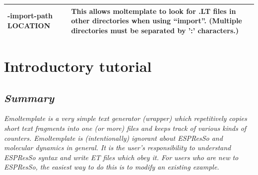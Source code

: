 \documentclass[11pt]{article}
\begin{document}
\begin{tabular}[h]{l|p{10cm}}
-import-path LOCATION
&
This allows moltemplate to look for .LT files
in other directories when using ``import''.
(Multiple directories must be separated by ':' characters.) 
\\
\hline
\end{tabular}

\pagebreak



\section{Introductory tutorial}
\label{sec:tutorial}
\subsection*{\textit{Summary}}
\textit{Emoltemplate is a very simple text generator (wrapper) which 
repetitively copies short text fragments into one (or more) files 
and keeps track of various kinds of counters.
Emoltemplate is (intentionally) ignorant about ESPResSo
and molecular dynamics in general. 
It is the user's responsibility to understand 
ESPResSo syntax and write ET files which obey it.
For users who are new to ESPResSo, the easiest way 
to do this is to modify an existing example.}
\end{document}
